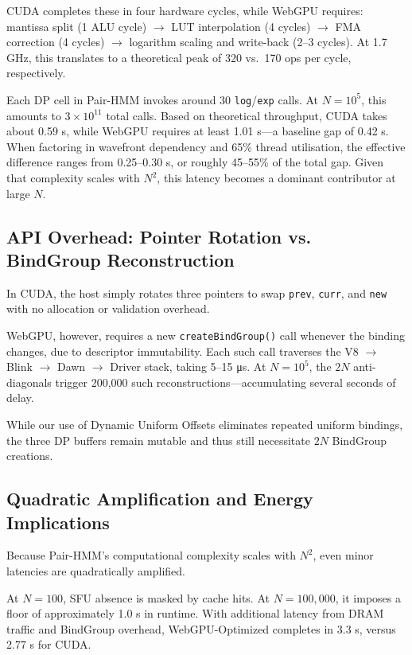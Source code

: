 \documentclass[PhD]{PHlab-thesis}
\begin{document}
CUDA completes these in four hardware cycles, while WebGPU requires:
mantissa split (1 ALU cycle) $\rightarrow$ LUT interpolation (4 cycles) $\rightarrow$ FMA correction (4 cycles) $\rightarrow$ logarithm scaling and write-back (2–3 cycles). At 1.7 GHz, this translates to a theoretical peak of 320 vs.\ 170 ops per cycle, respectively.

Each DP cell in Pair-HMM invokes around 30 \texttt{log}/\texttt{exp} calls. At $N=10^5$, this amounts to $3 \times 10^{11}$ total calls. Based on theoretical throughput, CUDA takes about 0.59 s, while WebGPU requires at least 1.01 s—a baseline gap of 0.42 s. When factoring in wavefront dependency and 65\% thread utilisation, the effective difference ranges from 0.25–0.30 s, or roughly 45–55\% of the total gap. Given that complexity scales with $N^2$, this latency becomes a dominant contributor at large $N$.


\subsection{API Overhead: Pointer Rotation vs. BindGroup Reconstruction}
In CUDA, the host simply rotates three pointers to swap \texttt{prev}, \texttt{curr}, and \texttt{new} with no allocation or validation overhead.

WebGPU, however, requires a new \texttt{createBindGroup()} call whenever the binding changes, due to descriptor immutability. Each such call traverses the V8 $\rightarrow$ Blink $\rightarrow$ Dawn $\rightarrow$ Driver stack, taking 5–15 μs. At $N = 10^5$, the $2N$ anti-diagonals trigger 200,000 such reconstructions—accumulating several seconds of delay.

While our use of Dynamic Uniform Offsets eliminates repeated uniform bindings, the three DP buffers remain mutable and thus still necessitate $2N$ BindGroup creations.

\subsection{Quadratic Amplification and Energy Implications}
Because Pair-HMM's computational complexity scales with $N^2$, even minor latencies are quadratically amplified.

At $N = 100$, SFU absence is masked by cache hits. At $N = 100,000$, it imposes a floor of approximately 1.0 s in runtime. With additional latency from DRAM traffic and BindGroup overhead, WebGPU-Optimized completes in 3.3 s, versus 2.77 s for CUDA.
\end{document}
